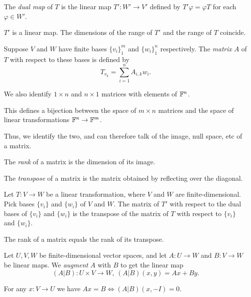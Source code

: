 \begin{defn}
  The \emph{dual map} of $T$ is the linear map $T':W'\to V'$ defined by
  $T'\varphi=\varphi T$ for each $\varphi\in W'$.
\end{defn}
\begin{prop}
  $T'$ is a linear map. The dimensions of the range of $T'$ and the range of $T$
  coincide.
\end{prop}
\begin{defn}
  Suppose $V$ and $W$ have finite bases $\{v_i\}_1^m$ and $\{w_i\}_1^n$
  respectively. The \emph{matrix} $A$ of $T$ with respect to these bases is
  defined by
  \[T_{v_k}=\sum_{i=1}^n A_{i,k}w_i.\]

  We also identify $1\times n$ and $n\times 1$ matrices with elements of
  $\mathbb{F}^n$.
\end{defn}
\begin{prop}
  This defines a bijection between the space of $m\times n$ matrices and the space
  of linear transformations $\mathbb{F}^n\to \mathbb{F}^m$.
\end{prop}
\begin{defn}
  Thus, we identify the two, and can therefore talk of the image, null space,
  etc of a matrix.
\end{defn}
\begin{defn}
  The \emph{rank} of a matrix is the dimension of its image.

  The \emph{transpose} of a matrix is the matrix obtained by reflecting over the
  diagonal.
\end{defn}
\begin{prop}
  Let $T:V\to W$ be a linear transformation, where $V$ and $W$ are
  finite-dimensional. Pick bases $\{v_i\}$ and $\{w_i\}$ 
  of $V$ and $W$. The matrix of $T'$ with respect
  to the dual bases of $\{v_i\}$ and $\{w_i\}$ 
  is the transpose of the matrix of $T$ with respect to $\{v_i\}$ and $\{w_i\}$.
\end{prop}
\begin{cor}
  The rank of a matrix equals the rank of its transpose.
\end{cor}
\begin{defn}
  Let $U,V,W$ be finite-dimensional vector spaces, and let $A:U\to W$ and
  $B:V\to W$ be linear maps. We \emph{augment} $A$ with $B$ to get the linear
  map
  \[(A|B):U\times V\to W,\ (A|B)(x,y)=Ax+By.\]
\end{defn}
\begin{prop}
  For any $x:V\to U$ we have $Ax=B\iff (A|B)(x,-I)=0$.
\end{prop}
